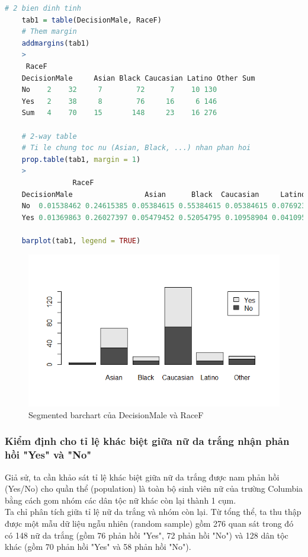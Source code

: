 \documentclass[a4paper,12pt]{article}
\begin{document}
	\begin{lstlisting}[language=R]
	# 2 bien dinh tinh
	tab1 = table(DecisionMale, RaceF)
	# Them margin
	addmargins(tab1)
	>
	 RaceF
	DecisionMale     Asian Black Caucasian Latino Other Sum
	No    2    32     7        72      7    10 130
	Yes   2    38     8        76     16     6 146
	Sum   4    70    15       148     23    16 276
	
	# 2-way table
	# Ti le chung toc nu (Asian, Black, ...) nhan phan hoi
	prop.table(tab1, margin = 1)
	>
	            RaceF
	DecisionMale                 Asian      Black  Caucasian     Latino      Other
	No  0.01538462 0.24615385 0.05384615 0.55384615 0.05384615 0.07692308
	Yes 0.01369863 0.26027397 0.05479452 0.52054795 0.10958904 0.04109589
	
	barplot(tab1, legend = TRUE)
	\end{lstlisting}
	\begin{figure}[H]
		\centering
		\includegraphics[width=0.7\linewidth]{Rplot4}
		\caption{Segmented barchart của DecisionMale và RaceF}
		\label{fig:rplot4}
	\end{figure}
	

	
	\subsubsection{Kiểm định cho tỉ lệ khác biệt giữa nữ da trắng nhận phản hồi "Yes" và "No"}
		Giả sử, ta cần khảo sát tỉ lệ khác biệt giữa nữ da trắng được nam phản hồi (Yes/No) cho quần thể (population) là toàn bộ sinh viên nữ của trường Columbia bằng cách gom nhóm các dân tộc nữ khác còn lại thành 1 cụm.\\
		
		Ta chỉ phân tích giữa tỉ lệ nữ da trắng và nhóm còn lại. Từ tổng thể, ta thu thập được một mẫu dữ liệu ngẫu nhiên (random sample) gồm 276 quan sát trong đó có 148 nữ da trắng (gồm 76 phản hồi "Yes", 72 phản hồi "No") và 128 dân tộc khác (gồm 70 phản hồi "Yes" và 58 phản hồi "No").\\
		
\end{document}
